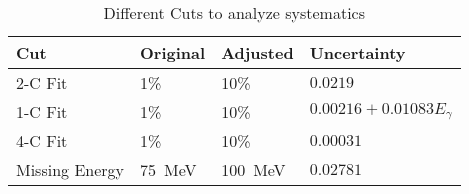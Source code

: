 \begin{table}[h!]
\begin{center}


\caption[Variance of Data Cut Systematics]{\label{tab:cutsystematics}Different Cuts to analyze systematics \vspace{0.75mm}}

\begin{tabular}{p{2.75cm} | p{1.25cm}|p{1.25cm} | p{3.4cm}}
\hline
Cut & Original & Adjusted & Uncertainty \\
\hline
2-C Fit  & 1\% & 10\% & $0.0219$\\
1-C Fit  & 1\% & 10\% & $ 0.00216 + 0.01083E_{\gamma}$ \\
4-C Fit  & 1\% & 10\% & $0.00031$\\
Missing Energy  & 75~MeV & 100~MeV & $0.02781$\\
\hline \hline
\end{tabular}


\end{center}
\end{table}
\vspace{20pt}